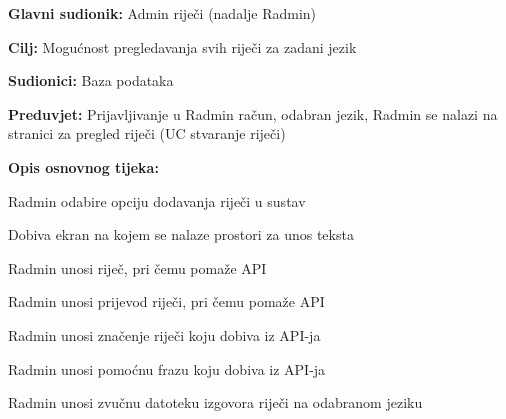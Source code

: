 \noindent {}
\begin{packed_item}

	\item \textbf{Glavni sudionik: } Admin riječi (nadalje Radmin)
	\item \textbf{Cilj: } Mogućnost pregledavanja svih riječi za zadani jezik
	\item \textbf{Sudionici: } Baza podataka
	\item \textbf{Preduvjet: } Prijavljivanje u Radmin račun, odabran jezik, Radmin se nalazi na stranici za pregled riječi (UC stvaranje riječi)	
	\item  \textbf{Opis osnovnog tijeka:}
	
	\item[] \begin{packed_enum}
		
		\item Radmin odabire opciju dodavanja riječi u sustav
		\item Dobiva ekran na kojem se nalaze prostori za unos teksta
		\item Radmin unosi riječ, pri čemu pomaže API
		\item Radmin unosi prijevod riječi, pri čemu pomaže API
		\item Radmin unosi značenje riječi koju dobiva iz API-ja
		\item Radmin unosi pomoćnu frazu koju dobiva iz API-ja
		\item Radmin unosi zvučnu datoteku izgovora riječi na odabranom jeziku

	\end{packed_enum}
	
\end{packed_item}


